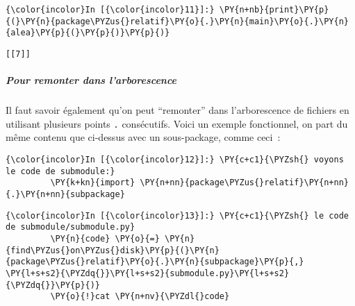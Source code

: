     \begin{Verbatim}[commandchars=\\\{\},frame=single,framerule=0.3mm,rulecolor=\color{cellframecolor}]
{\color{incolor}In [{\color{incolor}11}]:} \PY{n+nb}{print}\PY{p}{(}\PY{n}{package\PYZus{}relatif}\PY{o}{.}\PY{n}{main}\PY{o}{.}\PY{n}{alea}\PY{p}{(}\PY{p}{)}\PY{p}{)}
\end{Verbatim}


    \begin{Verbatim}[commandchars=\\\{\},frame=single,framerule=0.3mm,rulecolor=\color{cellframecolor}]
[[7]]
\end{Verbatim}

    \hypertarget{pour-remonter-dans-larborescence}{%
\subparagraph{Pour remonter dans
l'arborescence}\label{pour-remonter-dans-larborescence}}

    Il faut savoir également qu'on peut ``remonter'' dans l'arborescence de
fichiers en utilisant plusieurs points \texttt{.} consécutifs. Voici un
exemple fonctionnel, on part du même contenu que ci-dessus avec un
sous-package, comme ceci~:

    \begin{Shaded}
\begin{Highlighting}[frame=lines,framerule=0.6mm,rulecolor=\color{asisframecolor}]
\end{Highlighting}
\end{Shaded}

    \begin{Verbatim}[commandchars=\\\{\},frame=single,framerule=0.3mm,rulecolor=\color{cellframecolor}]
{\color{incolor}In [{\color{incolor}12}]:} \PY{c+c1}{\PYZsh{} voyons le code de submodule:}
         \PY{k+kn}{import} \PY{n+nn}{package\PYZus{}relatif}\PY{n+nn}{.}\PY{n+nn}{subpackage}
\end{Verbatim}


    \begin{Verbatim}[commandchars=\\\{\},frame=single,framerule=0.3mm,rulecolor=\color{cellframecolor}]
{\color{incolor}In [{\color{incolor}13}]:} \PY{c+c1}{\PYZsh{} le code de submodule/submodule.py}
         \PY{n}{code} \PY{o}{=} \PY{n}{find\PYZus{}on\PYZus{}disk}\PY{p}{(}\PY{n}{package\PYZus{}relatif}\PY{o}{.}\PY{n}{subpackage}\PY{p}{,} \PY{l+s+s2}{\PYZdq{}}\PY{l+s+s2}{submodule.py}\PY{l+s+s2}{\PYZdq{}}\PY{p}{)}
         \PY{o}{!}cat \PY{n+nv}{\PYZdl{}code}
\end{Verbatim}


